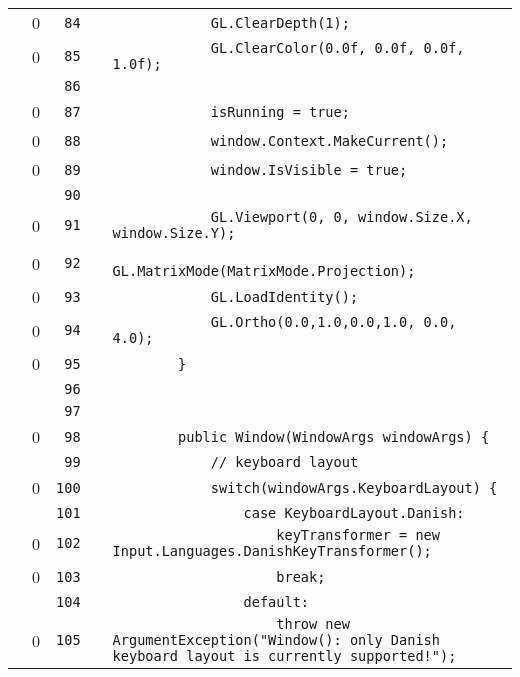 \documentclass[a4paper,landscape,10pt]{article}
\begin{document}
\begin{longtable}[l]{lrrll}
\cellcolor{red} & 0 & \verb~84~ & & \verb~            GL.ClearDepth(1);~\\
\cellcolor{red} & 0 & \verb~85~ & & \verb~            GL.ClearColor(0.0f, 0.0f, 0.0f, 1.0f);~\\
\cellcolor{gray} &  & \verb~86~ & & \verb~~\\
\cellcolor{red} & 0 & \verb~87~ & & \verb~            isRunning = true;~\\
\cellcolor{red} & 0 & \verb~88~ & & \verb~            window.Context.MakeCurrent();~\\
\cellcolor{red} & 0 & \verb~89~ & & \verb~            window.IsVisible = true;~\\
\cellcolor{gray} &  & \verb~90~ & & \verb~~\\
\cellcolor{red} & 0 & \verb~91~ & & \verb~            GL.Viewport(0, 0, window.Size.X, window.Size.Y);~\\
\cellcolor{red} & 0 & \verb~92~ & & \verb~            GL.MatrixMode(MatrixMode.Projection);~\\
\cellcolor{red} & 0 & \verb~93~ & & \verb~            GL.LoadIdentity();~\\
\cellcolor{red} & 0 & \verb~94~ & & \verb~            GL.Ortho(0.0,1.0,0.0,1.0, 0.0, 4.0);~\\
\cellcolor{red} & 0 & \verb~95~ & & \verb~        }~\\
\cellcolor{gray} &  & \verb~96~ & & \verb~~\\
\cellcolor{gray} &  & \verb~97~ & & \verb~~\\
\cellcolor{red} & 0 & \verb~98~ & & \verb~        public Window(WindowArgs windowArgs) {~\\
\cellcolor{gray} &  & \verb~99~ & & \verb~            // keyboard layout~\\
\cellcolor{red} & 0 & \verb~100~ & & \verb~            switch(windowArgs.KeyboardLayout) {~\\
\cellcolor{gray} &  & \verb~101~ & & \verb~                case KeyboardLayout.Danish:~\\
\cellcolor{red} & 0 & \verb~102~ & & \verb~                    keyTransformer = new Input.Languages.DanishKeyTransformer();~\\
\cellcolor{red} & 0 & \verb~103~ & & \verb~                    break;~\\
\cellcolor{gray} &  & \verb~104~ & & \verb~                default:~\\
\cellcolor{red} & 0 & \verb~105~ & & \verb~                    throw new ArgumentException("Window(): only Danish keyboard layout is currently supported!");~\\

\end{longtable}
\end{document}
